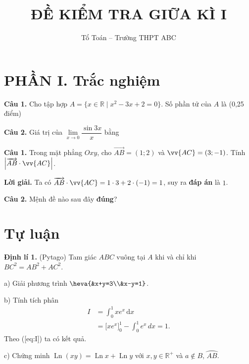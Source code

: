 \documentclass[12pt,a4paper]{article}
\title{ĐỀ KIỂM TRA GIỮA KÌ I}
\author{Tổ Toán -- Trường THPT ABC}
\date{}
\begin{document}
\maketitle
\section*{PHẦN I. Trắc nghiệm}


\textbf{Câu 1.}  Cho tập hợp $A=\{x\in\mathbb{R} \mid x^2-3x+2=0\}$. Số phần tử của $A$ là (0,25 điểm)



\textbf{Câu 2.}  Giá trị của $\lim\limits_{x\to 0}\dfrac{\sin 3x}{x}$ bằng



\textbf{Câu 1.} %
Trong mặt phẳng $Oxy$, cho $\overrightarrow{AB}=(1;2)$ và $\vv{AC}=(3;-1)$. Tính $\left\lvert\overrightarrow{AB}\cdot\vv{AC}\right\rvert$.


\textbf{Lời giải.} Ta có $\overrightarrow{AB}\cdot\vv{AC}=1\cdot 3+2\cdot(-1)=1$, suy ra \textbf{đáp án} là $1$.








\textbf{Câu 2.} 
Mệnh đề nào sau đây \textbf{đúng}?




\section{Tự luận}


\textbf{Định lí 1.} (Pytago) 
Tam giác $ABC$ vuông tại $A$ khi và chỉ khi $BC^2=AB^2+AC^2$.






a) Giải phương trình $\heva{&x+y=3\\&x-y=1}$.

b) Tính tích phân
\begin{align}
I &= \int_0^1 x e^{x}\,\mathrm{d}x \label{eq:I}\\
  &= \Big[x e^x\Big]_0^1 - \int_0^1 e^x\,dx = 1. \nonumber
\end{align}
Theo ([eq:I]) ta có kết quả.

c) Chứng minh $\operatorname{Ln}(xy)=\operatorname{Ln} x+\operatorname{Ln} y$ với $x,y\in\mathbb{R}^{+}$ và $a\not\in B$, $\overparen{AB}$.
\end{document}
